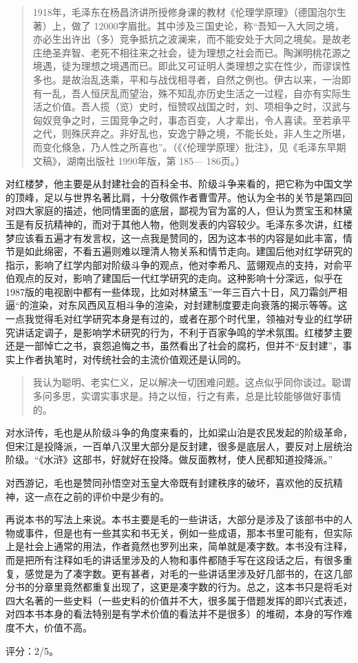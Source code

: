 \begin{quotation}
1918年，毛泽东在杨昌济讲所授修身课的教材《伦理学原理》（德国泡尔生著）上，做了 12000字眉批。其中涉及三国史论，称“吾知一入大同之境，亦必生出许出（多）竞争抵抗之波澜来，而不能安处于大同之境矣。是故老庄绝圣弃智、老死不相往来之社会，徒为理想之社会而已。陶渊明桃花源之境遇，徒为理想之境遇而已。即此又可证明人类理想之实在性少，而谬误性多也。是故治乱迭乘，平和与战伐相寻者，自然之例也。伊古以来，一治即有一乱，吾人恒厌乱而望治，殊不知乱亦历史生活之一过程，自亦有实际生活之价值。吾人揽（览）史时，恒赞叹战国之时，刘、项相争之时，汉武与匈奴竞争之时，三国竞争之时，事态百变，人才辈出，令人喜读。至若承平之代，则殊厌弃之。非好乱也，安逸宁静之境，不能长处，非人生之所堪，而变化倏急，乃人性之所喜也”。（《〈伦理学原理〉批注》，见《毛泽东早期文稿》，湖南出版社 1990年版，第 185— 186页。）
\end{quotation}

对红楼梦，他主要是从封建社会的百科全书、阶级斗争来看的，把它称为中国文学的顶峰，足以与世界名著比肩，十分敬佩作者曹雪芹。他认为全书的关节是第四回对四大家庭的描述，他同情里面的底层，鄙视为官为富的人，但认为贾宝玉和林黛玉是有反抗精神的，而对于其他人物，他则发表的内容较少。毛泽东多次讲，红楼梦应该看五遍才有发言权，这一点我是赞同的，因为这本书的内容是如此丰富，情节是如此绵密，不看五遍则难以理清人物关系和情节走向。建国后他对红学研究的指示，影响了红学内部对阶级斗争的观点，他对李希凡、蓝翎观点的支持，对俞平伯观点的反对，影响了建国后一代红学研究的走向。这种影响十分深远，似乎在1987版的电视剧中都有一些体现，比如对林黛玉”一年三百六十日，风刀霜剑严相逼“的渲染，对东风西风互相斗争的渲染，对封建制度要走向衰落的揭示等等。这一点我觉得毛对红学研究本身是有过的，或者在那个时代里，领袖对专业的红学研究讲话定调子，是影响学术研究的行为，不利于百家争鸣的学术氛围。红楼梦主要还是一部悼亡之书，哀怨追悔之书，虽然看出了社会的腐朽，但并不“反封建”，事实上作者执笔时，对传统社会的主流价值观还是认同的。

\begin{quotation}
我认为聪明、老实仁义，足以解决一切困难问题。这点似乎同你谈过。聪谓多问多思，实谓实事求是。持之以恒，行之有素，总是比较能够做好事情的。
\end{quotation}

对水浒传，毛也是从阶级斗争的角度来看的，比如梁山泊是农民发起的阶级革命，但宋江是投降派，一百单八汉里大部分是反封建，很多是底层人，要反对上层统治阶级。“《水浒》这部书，好就好在投降。做反面教材，使人民都知道投降派。”

对西游记，毛也是赞同孙悟空对玉皇大帝既有封建秩序的破坏，喜欢他的反抗精神，这一点在之前的评价中是少有的。

再说本书的写法上来说。本书主要是毛的一些讲话，大部分是涉及了该部书中的人物或事件，但是也有一些其实和书无关，例如一些成语，那本书里可能有，但实际上是社会上通常的用法，作者竟然也罗列出来，简单就是凑字数。本书没有注释，而是把所有注释如毛的讲话里涉及的人物和事件都随手写在这段话之后，有很多重复，感觉是为了凑字数。更有甚者，对毛的一些讲话里涉及好几部书的，在这几部分书的分章里竟然都重复出现了，这更是凑字数的行为。总之，这本书只是将毛对四大名著的一些史料（一些史料的价值并不大，很多属于借题发挥的即兴式表述，对四本书本身的看法特别是有学术价值的看法并不是很多）的堆砌，本身的写作难度不大，价值不高。

评分：2/5。